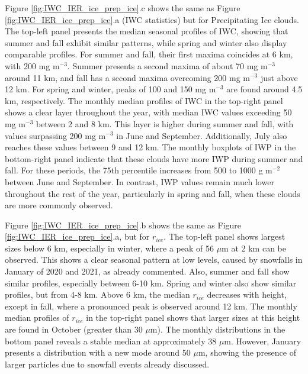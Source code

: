 Figure \ref{fig:IWC_IER_ice_prep_ice}.c shows the same as Figure \ref{fig:IWC_IER_ice_prep_ice}.a (IWC statistics) but for Precipitating Ice clouds. The top-left panel presents the median seasonal profiles of IWC, showing that summer and fall exhibit similar patterns, while spring and winter also display comparable profiles. For summer and fall, their first maxima coincides at 6 km, with 200 mg m$^{-3}$. Summer presents a second maxima of about 70 mg m$^{-3}$ around 11 km, and fall has a second maxima overcoming 200 mg m$^{-3}$ just above 12 km. For spring and winter, peaks of 100 and 150 mg m$^{-3}$ are found around 4.5 km, respectively. The monthly median profiles of IWC in the top-right panel shows a clear layer throughout the year, with median IWC values exceeding 50 mg m$^{-3}$ between 2 and 8 km. This layer is higher during summer and fall, with values surpassing 200 mg m$^{-3}$ in June and September. Additionally, July also reaches these values between 9 and 12 km. The monthly boxplots of IWP in the bottom-right panel indicate that these clouds have more IWP during summer and fall. For these periods, the 75th percentile increases from 500 to 1000 g m$^{-2}$ between June and September. In contrast, IWP values remain much lower throughout the rest of the year, particularly in spring and fall, when these clouds are more commonly observed.

Figure \ref{fig:IWC_IER_ice_prep_ice}.b shows the same as Figure \ref{fig:IWC_IER_ice_prep_ice}.a, but for $r_{ice}$. The top-left panel shows largest sizes below 6 km, especially in winter, where a peak of 56 $\mu$m at 2 km can be observed. This shows a clear seasonal pattern at low levels, caused by snowfalls in January of 2020 and 2021, as already commented. Also, summer and fall show similar profiles, especially between 6-10 km. Spring and winter also show similar profiles, but from 4-8 km.
Above 6 km, the median $r_{ice}$ decreases with height, except in fall, where a pronounced peak is observed around 12 km. The monthly median profiles of $r_{ice}$ in the top-right panel shows that larger sizes at this height are found in October (greater than 30 $\mu$m). The monthly distributions in the bottom panel reveals a stable median at approximately 38 $\mu$m. However, January presents a distribution with a new mode around 50 $\mu$m, showing the presence of larger particles due to snowfall events already discussed.


